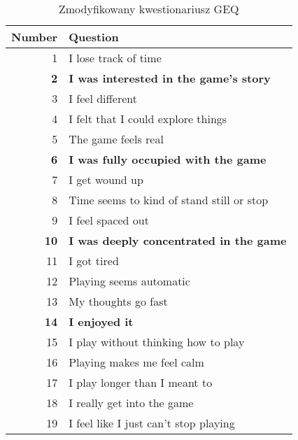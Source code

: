 \begin{table}[ht]
      \begin{center}
            \begin{tabular}{|r | l|}
                  \hline
                  Number      & Question                                       \\
                  \hline
                  1           & I lose track of time                           \\
                  \textbf{2}  & \textbf{I was interested in the game's story}  \\
                  3           & I feel different                               \\
                  4           & I felt that I could explore things             \\
                  5           & The game feels real                            \\
                  \textbf{6}  & \textbf{I was fully occupied with the game}    \\
                  7           & I get wound up                                 \\
                  8           & Time seems to kind of stand still or stop      \\
                  9           & I feel spaced out                              \\
                  \textbf{10} & \textbf{I was deeply concentrated in the game} \\
                  11          & I got tired\footnotemark{}                     \\
                  12          & Playing seems automatic                        \\
                  13          & My thoughts go fast                            \\
                  \textbf{14} & \textbf{I enjoyed it}                          \\
                  15          & I play without thinking how to play            \\
                  16          & Playing makes me feel calm                     \\
                  17          & I play longer than I meant to                  \\
                  18          & I really get into the game                     \\
                  19          & I feel like I just can't stop playing          \\
                  \hline
            \end{tabular}
      \end{center}
      \caption{Zmodyfikowany kwestionariusz GEQ}\label{tab1:ch3_2}
\end{table}

